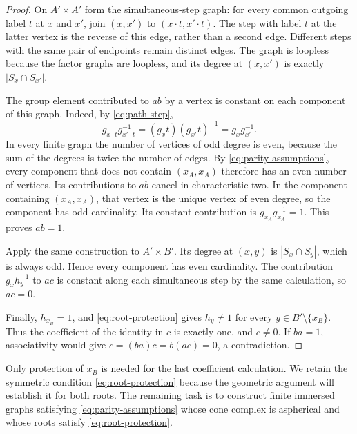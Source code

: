 \begin{proof}
On $A'\times A'$ form the simultaneous-step graph: for every common
outgoing label $t$ at $x$ and $x'$, join $(x,x')$ to
$(x\cdot t,x'\cdot t)$.  The step with label $\bar t$ at the latter
vertex is the reverse of this edge, rather than a second edge.
Different steps with the same pair of endpoints remain distinct edges.
The graph is loopless because the factor graphs are loopless, and its
degree at $(x,x')$ is exactly $|S_x\cap S_{x'}|$.

The group element contributed to $ab$ by a vertex is constant on each
component of this graph.  Indeed, by \eqref{eq:path-step},
\[
 g_{x\cdot t}g_{x'\cdot t}^{-1}
   =(g_xt)(g_{x'}t)^{-1}=g_xg_{x'}^{-1}.
\]
In every finite graph the number of vertices of odd degree is even,
because the sum of the degrees is twice the number of edges.  By
\eqref{eq:parity-assumptions}, every component that does not contain
$(x_A,x_A)$ therefore has an even number of vertices.  Its contributions
to $ab$ cancel in characteristic two.  In the component containing
$(x_A,x_A)$, that vertex is the unique vertex of even degree, so the
component has odd cardinality.  Its constant contribution is
$g_{x_A}g_{x_A}^{-1}=1$.  This proves $ab=1$.

Apply the same construction to $A'\times B'$.  Its degree at $(x,y)$ is
$|S_x\cap S_y|$, which is always odd.  Hence every component has even
cardinality.  The contribution $g_xh_y^{-1}$ to $ac$ is constant along
each simultaneous step by the same calculation, so $ac=0$.

Finally, $h_{x_B}=1$, and \eqref{eq:root-protection} gives $h_y\ne1$
for every $y\in B'\setminus\{x_B\}$.  Thus the coefficient of the
identity in $c$ is exactly one, and $c\ne0$.  If $ba=1$, associativity
would give $c=(ba)c=b(ac)=0$, a contradiction.
\end{proof}

Only protection of $x_B$ is needed for the last coefficient calculation.
We retain the symmetric condition \eqref{eq:root-protection} because
the geometric argument will establish it for both roots.  The remaining
task is to construct finite immersed graphs satisfying
\eqref{eq:parity-assumptions} whose cone complex is aspherical and whose
roots satisfy \eqref{eq:root-protection}.

